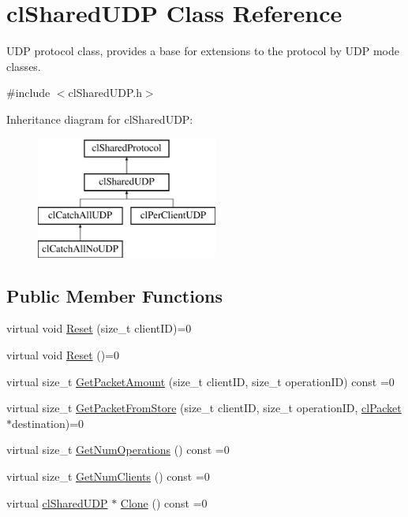 \hypertarget{classcl_shared_u_d_p}{
\section{clSharedUDP Class Reference}
\label{classcl_shared_u_d_p}
}


UDP protocol class, provides a base for extensions to the protocol by UDP mode classes.  




{\ttfamily \#include $<$clSharedUDP.h$>$}

Inheritance diagram for clSharedUDP:\begin{figure}[H]
\begin{center}
\leavevmode
\includegraphics[height=4.000000cm]{classcl_shared_u_d_p}
\end{center}
\end{figure}
\subsection*{Public Member Functions}
\begin{DoxyCompactItemize}
\item 
virtual void \hyperlink{classcl_shared_u_d_p_a6985d2cd42ad37bc2477efb162bad157}{Reset} (size\_\-t clientID)=0
\item 
virtual void \hyperlink{classcl_shared_u_d_p_a086fea6811fed1dc76d54ba9cbf52763}{Reset} ()=0
\item 
virtual size\_\-t \hyperlink{classcl_shared_u_d_p_ac27f28fb266c9faaf44ee7e515ab0727}{GetPacketAmount} (size\_\-t clientID, size\_\-t operationID) const =0
\item 
virtual size\_\-t \hyperlink{classcl_shared_u_d_p_a8b6e71b0ce806b23e378fe7206a0d8a5}{GetPacketFromStore} (size\_\-t clientID, size\_\-t operationID, \hyperlink{classcl_packet}{clPacket} $\ast$destination)=0
\item 
virtual size\_\-t \hyperlink{classcl_shared_u_d_p_a4018cccdd8593a0df78f7dd6f59c40c1}{GetNumOperations} () const =0
\item 
virtual size\_\-t \hyperlink{classcl_shared_u_d_p_afacd36fa8d2b7bb21bff349cf0c1b3c9}{GetNumClients} () const =0
\item 
virtual \hyperlink{classcl_shared_u_d_p}{clSharedUDP} $\ast$ \hyperlink{classcl_shared_u_d_p_a62267e9d085f8e6b72a91fadf4a55670}{Clone} () const =0
\end{DoxyCompactItemize}
